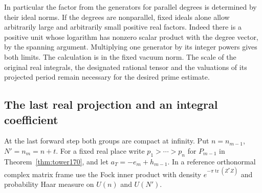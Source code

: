 \documentclass[a4paper,11pt]{article}
\theoremstyle{definition}
\theoremstyle{remark}
\numberwithin{equation}{section}
\begin{document}
In particular the factor from the generators for parallel
degrees is determined by their ideal norms. If the degrees
are nonparallel, fixed ideals alone allow arbitrarily large
and arbitrarily small positive real factors. Indeed there
is a positive unit whose logarithm has nonzero scalar product
with the degree vector, by the spanning argument. Multiplying
one generator by its integer powers gives both limits.
The calculation is in the fixed vacuum norm. The scale of
the original real integrals, the designated rational tensor
and the valuations of its projected period remain necessary
for the desired prime estimate.

\subsection{The last real projection and an integral coefficient}\label{nav:VIII-24}
At the last forward step both groups are compact at infinity.
Put \(n=n_{m-1}\), \(N'=n_m=n+t\). For a fixed real place
write \(p_1>\cdots>p_n\) for \(P_{m-1}\) in
Theorem~\ref{thm:tower170}, and let \(a_T=-e_m+h_{m-1}\).
In a reference orthonormal complex matrix frame use the
Fock inner product with density
\(e^{-\pi\operatorname{tr}(Z^*Z)}\) and probability Haar
measure on \(U(n)\) and \(U(N')\).
\end{document}
